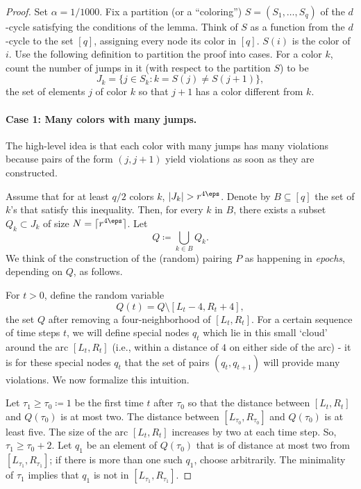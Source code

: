 \documentclass{article}
\begin{document}
\begin{proof}
Set $\alpha = 1/1000$. Fix a partition (or a ``coloring'') $S = (S_1,\ldots, S_q)$ of the $d$-cycle satisfying the conditions of the lemma.
Think of $S$ as a function from the $d$-cycle to the set $[q]$, assigning every node its color in $[q]$. $S(i)$ is the
color of $i$. Use the following definition to partition the proof into cases. For a color $k$, count the
number of jumps in it (with respect to the partition $S$) to be
\[
J_k = \{j \in S_k : k = S(j) \neq S(j + 1)\},
\]
the set of elements $j$ of color $k$ so that $j + 1$ has a color different from $k$. 

\paragraph{Case 1: Many colors with many jumps.}  The high-level idea is that each color with many jumps
has many violations because pairs of the form $(j, j + 1)$ yield violations as soon as they are constructed.

Assume that for at least $q/2$ colors $k$,
$|J_k| > r^{4\eps}$.
Denote by $B \subseteq [q]$ the set of $k$’s that satisfy this inequality. Then, for every $k$ in $B$, there exists
a subset $Q_k \subset J_k$ of size $N = \lceil r^{4\eps}\rceil$. Let
\[
Q \coloneqq \bigcup_{k\in B} Q_k.
\]
We think of the construction of the (random) pairing $P$ as happening in \emph{epochs}, depending on $Q$, as
follows.


For $t > 0$, define the random variable
\[
Q(t) = Q \setminus [L_t - 4, R_t + 4],
\]
the set $Q$ after removing a four-neighborhood of $[L_t, R_t]$. %
For a certain sequence of time steps $t$, we will define special nodes $q_t$ which lie in this small `cloud' around the arc $[L_t,R_t]$ (i.e., within a distance of $4$ on either side of the arc) - it is for these special nodes $q_t$ that the set of pairs $(q_t,q_{t+1})$ will provide many violations. We now formalize this intuition. 

Let $\tau_1 \geq \tau_0 \coloneqq 1$ be the first time $t$ after $\tau_0$ so that the distance between $[L_t
, R_t
]$ and $Q(\tau_0)$ is
at most two. The distance between $[L_{\tau_0
}
, R_{\tau_0}
]$ and $Q(\tau_0)$ is at least five. The size of the arc $[L_t
, R_t
]$ increases by two at each time step. So, $\tau_1 \geq \tau_0+ 2$. Let $q_1$ be an element of $Q(\tau_0)$ that is of distance
at most two from $[L_{\tau_1}
, R_{\tau_1}
]$; if there is more than one such $q_1$, choose arbitrarily. The minimality
of $\tau_1$ implies that $q_1$ is not in $[L_{\tau_1}
, R_{\tau_1}
]$.


\end{proof}
\end{document}
